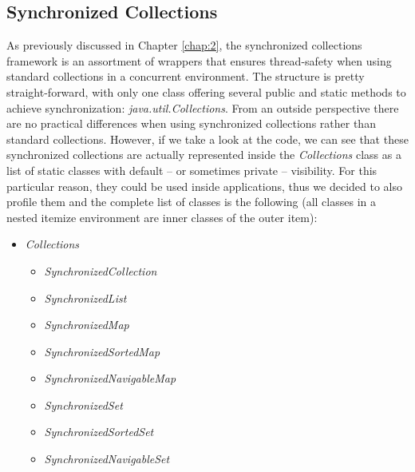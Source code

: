 \documentclass[]{usiinfthesis}
\begin{document}
\subsection{Synchronized Collections}
As previously discussed in Chapter \ref{chap:2}, the synchronized collections framework is an assortment of wrappers that ensures thread-safety when using standard collections in a concurrent environment. The structure is pretty straight-forward, with only one class offering several public and static methods to achieve synchronization: \textit{java.util.Collections}. From an outside perspective there are no practical differences when using synchronized collections rather than standard collections. However, if we take a look at the code, we can see that these synchronized collections are actually represented inside the \textit{Collections} class as a list of static classes with default -- or sometimes private -- visibility. For this particular reason, they could be used inside applications, thus we decided to also profile them and the complete list of classes is the following (all classes in a nested itemize environment are inner classes of the outer item):
\begin{itemize}
    \item \textit{Collections}
    \begin{itemize}
        \item \textit{SynchronizedCollection} 
        \item \textit{SynchronizedList} 
        \item \textit{SynchronizedMap} 
        \item \textit{SynchronizedSortedMap}
        \item \textit{SynchronizedNavigableMap}
        \item \textit{SynchronizedSet}
        \item \textit{SynchronizedSortedSet}
        \item \textit{SynchronizedNavigableSet}
    \end{itemize}
\end{itemize}
\end{document}
